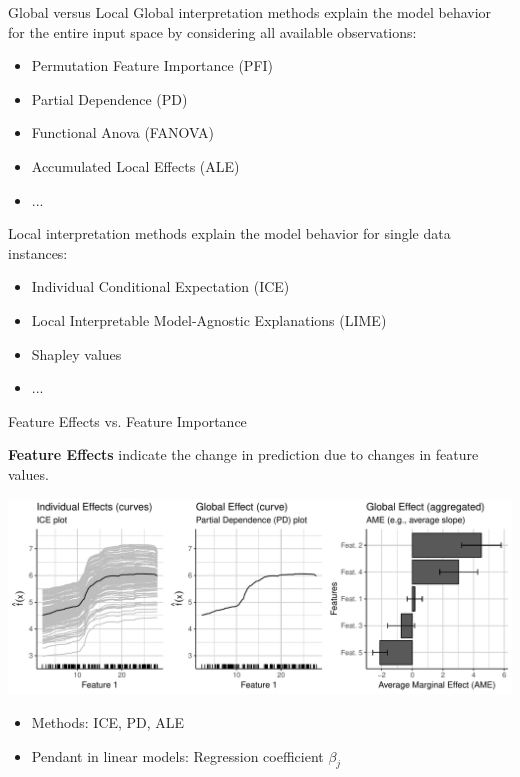 \documentclass[11pt,compress,t,notes=noshow, aspectratio=169, xcolor=table]{beamer}
\begin{document}
	


\begin{vbframe}{Global versus Local}
Global interpretation methods explain the model behavior for the entire input space by considering all available observations:
	\begin{itemize}
		\item Permutation Feature Importance (PFI)
		\item Partial Dependence (PD)
		\item Functional Anova (FANOVA)
		\item Accumulated Local Effects (ALE)
		\item ...
	\end{itemize}
\bigskip
Local interpretation methods explain the model behavior for single data instances:
	\begin{itemize}
		\item Individual Conditional Expectation (ICE)
		\item Local Interpretable Model-Agnostic Explanations (LIME)
		\item Shapley values
		\item ...
	\end{itemize}
\end{vbframe}

\begin{vbframe}{Feature Effects vs. Feature Importance}
	
	\textbf{Feature Effects} indicate the change in prediction due to changes in feature values.
	\medskip
	\begin{center}
		\includegraphics[page=1, width=\textwidth]{figure/feature-effects}
	\end{center}
	\begin{itemize}
		\item Methods: ICE, PD, ALE
		\item Pendant in linear models: Regression coefficient $\beta_j$
	\end{itemize}
\end{vbframe}
\end{document}
